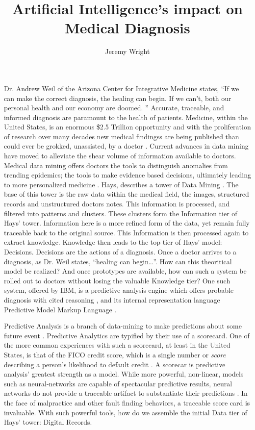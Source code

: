\documentclass[12pt,letterpaper]{article}
\title{Artificial Intelligence's impact on Medical Diagnosis}
\author{Jeremy Wright}
\begin{document}
\maketitle


Dr. Andrew Weil of the Arizona Center for Integrative Medicine states, ``If we
can make the correct diagnosis, the healing can begin. If we can't, both our
personal health and our economy are doomed. \autocite{Weil2009}'' Accurate,
traceable, and informed diagnosis are paramount to the health of patients.
Medicine, within the United States, is an enormous \$2.5 Trillion
opportunity and with the proliferation of research over many decades new medical
findingss are being published than could ever be grokked,
unassisted, by a doctor \autocite{Hays2012}.  Current advances in data
mining have moved to alleviate the shear volume of information available to
doctors. Medical data mining offers doctors the tools to distinguish anomalies from
trending epidemics; the tools to make evidence based decisions, ultimately leading to more personalized
medicine \autocite{Hays2012}. Hays, describes a tower of Data Mining
\autocite{Hays2012}. The base
of this tower is the raw data within the medical field, the images, structured
records and unstructured doctors notes. This information is processed, and
filtered into patterns and clusters. These clusters form the Information tier of
Hays' tower. Information here is a more refined form of the data, yet remain fully
traceable back to the original source. This Information is then processed again
to extract knowledge. Knowledge then leads to the top tier of Hays' model:
Decisions. Decisions are the actions of a diagnosis. Once a doctor
arrives to a diagnosis, as Dr. Weil states, ``healing can begin\ldots''. How can
this theoritical model be realized? And once prototypes are available, how can such a system
be rolled out to doctors without losing the valuable Knowledge tier?
One such system, offered by IBM, is a predictive analysis engine which offers
probable diagnosis with cited reasoning \autocite{Guazzelli2011}, and its
internal representation language Predictive Model Markup Language
\autocite{WikiPredictiveLanguage}.

Predictive Analysis is a branch of data-mining to make predictions about some
future event \autocite{WikiPredictiveAnalysis}. Predictive Analytics are
typified by their use of a scorecard. One of the more common
experiences with such a scorecard, at least in the United States, is that of
the FICO credit score, which is a single number or \emph{score} describing
a person's likelihood to default credit \autocite{Guazzelli2011}. A scorecar is
predictive analysis' greatest strength as a model. While more powerful, non-linear, models such as
neural-networks are capable of spectacular predictive results, neural networks do
not provide a traceable artifact to substantiate their predictions
\autocite{Segaran2008}. In the face
of malpractice and other fault finding behaviors, a traceable score card is
invaluable. With such powerful tools, how do we assemble the initial Data tier of
Hays' tower: Digital Records.
\end{document}
